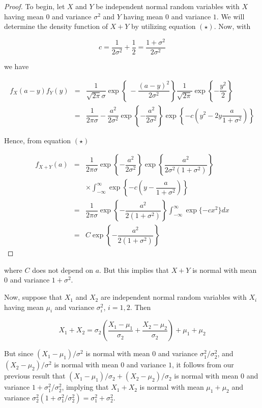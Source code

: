 \begin{proof}
	To begin, let $X$ and $Y$ be independent normal random variables with $X$ having mean $0$ and variance $\sigma^2$ and $Y$ having mean $0$ and variance $1$. We will determine the density function of $X + Y$ by utilizing equation $(\star)$. Now, with
	
	$$c = \dfrac{1}{2 \sigma^2} + \dfrac{1}{2} = \dfrac{1 + \sigma^2}{2\sigma^2}$$
	
	we have
	
	\begin{eqnarray*}
		f_X(a - y)f_Y(y) &=& \dfrac{1}{\sqrt{2\pi}\sigma}\exp\left\{\ -\dfrac{(a - y)^2}{2\sigma^2} \right\} \dfrac{1}{\sqrt{2\pi}}\exp\left\{-\dfrac{y^2}{2} \right\}\\
		&=& \dfrac{1}{2 \pi \sigma}-\dfrac{a^2}{2\sigma^2} \exp \left\{ -\dfrac{a^2}{2\sigma^2}  \right\} \exp\left\{ -c\left( y^2 - 2y\dfrac{a}{1 + \sigma^2} \right) \right\}
	\end{eqnarray*}
	
	Hence, from equation $(\star)$
	
	\begin{eqnarray*}
		f_{X + Y}(a) &=& \dfrac{1}{2\pi \sigma}\exp \left\{ - \dfrac{a^2}{2\sigma^2} \right\} \exp \left\{ \dfrac{a^2}{2 \sigma^2 (1 + \sigma^2)} \right\}\\
		&& \times \int^{\infty}_{-\infty}\exp \left\{ -c \left( y - \dfrac{a}{1 + \sigma^2} \right) \right\}\\
		&=& \dfrac{1}{2\pi \sigma} \exp \left\{ - \dfrac{a^2}{2(1 + \sigma^2)} \right\} \int^{\infty}_{-\infty} \exp \{ -cx^2 \} dx\\
		&=& C \exp \left\{ - \dfrac{a^2}{2 (1 + \sigma^2)}\right\}
	\end{eqnarray*}
\end{proof}

where $C$ does not depend on $a$. But this implies that $X + Y$ is normal with mean $0$ and variance $1 + \sigma^2$.

Now, suppose that $X_1$ and $X_2$ are independent normal random variables with $X_i$ having mean $\mu_i$ and variance $\sigma^2_i$, $i = 1,2$. Then

$$X_1 + X_2 = \sigma_2 \left( \dfrac{X_1 - \mu_1}{\sigma_2} + \dfrac{X_2 - \mu_2}{\sigma_2} \right) + \mu_1 + \mu_2$$

But since $(X_1 - \mu_1)/ \sigma^2$ is normal with mean $0$ and variance $\sigma^2_1/\sigma^2_2$, and $(X_2 - \mu_2)/\sigma^2$ is normal with mean $0$ and variance $1$, it follows from our previous result that $(X_1 - \mu_1)/\sigma_2 + (X_2 - \mu_2)/\sigma_2$ is normal with mean $0$ and variance $1 + \sigma^2_1/\sigma^2_2$, implying that $X_1 + X_2$ is normal with mean $\mu_1 + \mu_2$ and variance $\sigma_2^2(1 + \sigma_1^2/\sigma^2_2) = \sigma_1^2 + \sigma^2_2$. 

